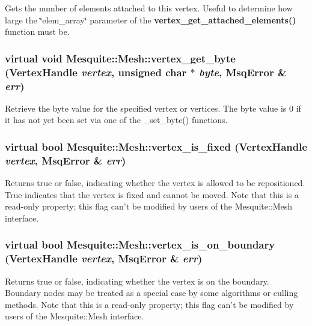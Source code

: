 \documentclass[letter]{report}
\begin{document}
Gets the number of elements attached to this vertex. Useful to determine how large the \char`\"{}elem\_\-array\char`\"{} parameter of the {\bf vertex\_\-get\_\-attached\_\-elements()} function must be. 

\subsubsection{\setlength{\rightskip}{0pt plus 5cm}virtual void Mesquite::Mesh::vertex\_\-get\_\-byte (Vertex\-Handle {\em vertex}, unsigned char $\ast$ {\em byte}, {\bf Msq\-Error} \& {\em err})\hspace{0.3cm}{\tt  [pure virtual]}}\label{classMesquite_1_1Mesh_a13}


Retrieve the byte value for the specified vertex or vertices. The byte value is 0 if it has not yet been set via one of the \_\-set\_\-byte() functions. 

\subsubsection{\setlength{\rightskip}{0pt plus 5cm}virtual bool Mesquite::Mesh::vertex\_\-is\_\-fixed (Vertex\-Handle {\em vertex}, {\bf Msq\-Error} \& {\em err})\hspace{0.3cm}{\tt  [pure virtual]}}\label{classMesquite_1_1Mesh_a7}

Returns true or false, indicating whether the vertex is allowed to be repositioned. True indicates that the vertex is fixed and cannot be moved. Note that this is a read-only property; this flag can't be modified by users of the Mesquite::Mesh interface. 

\subsubsection{\setlength{\rightskip}{0pt plus 5cm}virtual bool Mesquite::Mesh::vertex\_\-is\_\-on\_\-boundary (Vertex\-Handle {\em vertex}, {\bf Msq\-Error} \& {\em err})\hspace{0.3cm}{\tt  [pure virtual]}}\label{classMesquite_1_1Mesh_a8}


Returns true or false, indicating whether the vertex is on the boundary. Boundary nodes may be treated as a special case by some algorithms or culling methods. Note that this is a read-only property; this flag can't be modified by users of the Mesquite::Mesh interface. 
\end{document}
